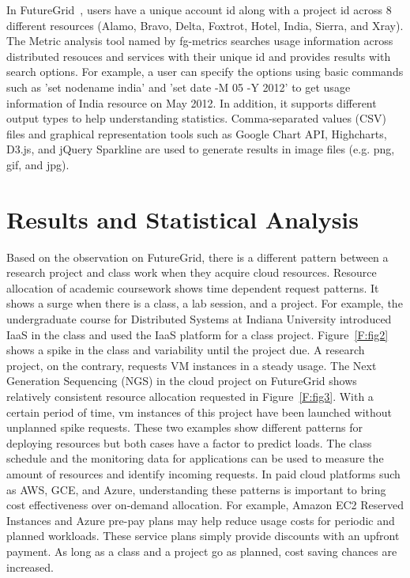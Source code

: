 \documentclass{sig-alternate}
\begin{document}
In FutureGrid~\cite{las2010gce,las12fg-bookchapter}, users have a unique account id along with a project id across 8 different resources (Alamo, Bravo, Delta, Foxtrot, Hotel, India, Sierra, and Xray). The Metric analysis tool named by fg-metrics searches usage information across distributed resouces and services with their unique id and provides results with search options. For example, a user can specify the options using basic commands such as 'set nodename india' and 'set date -M 05 -Y 2012' to get usage information of India resource on May 2012. In addition, it supports different output types to help understanding statistics. Comma-separated values (CSV) files and graphical representation tools such as Google Chart API, Highcharts, D3.js, and jQuery Sparkline are used to generate results in image files (e.g. png, gif, and jpg).

\section{Results and Statistical Analysis} \label{S:result}

Based on the observation on FutureGrid, there is a different pattern between a research project and class work when they acquire cloud resources. Resource allocation of academic coursework shows time dependent request patterns. It shows a surge when there is a class, a lab session, and a project. For example, the undergraduate course for Distributed Systems at Indiana University introduced IaaS in the class and used the IaaS platform for a class project. Figure~\ref{F:fig2} shows a spike in the class and variability until the project due. A research project, on the contrary, requests VM instances in a steady usage. The Next Generation Sequencing (NGS) in the cloud project on FutureGrid shows relatively consistent resource allocation requested in Figure~\ref{F:fig3}. With a certain period of time, vm instances of this project have been launched without unplanned spike requests. These two examples show different patterns for deploying resources but both cases have a factor to predict loads. The class schedule and the monitoring data for applications can be used to measure the amount of resources and identify incoming requests. In paid cloud platforms such as AWS, GCE, and Azure, understanding these patterns is important to bring cost effectiveness over on-demand allocation. For example, Amazon EC2 Reserved Instances and Azure pre-pay plans may help reduce usage costs for periodic and planned workloads. These service plans simply provide discounts with an upfront payment. As long as a class and a project go as planned, cost saving chances are increased.
\end{document}
